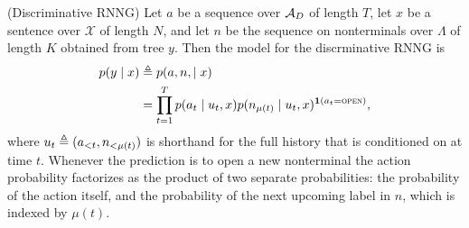 
    \begin{definition}{(Discriminative RNNG)}
      \label{def:disc-rnng}
      Let $a$ be a sequence over $\mathcal{A}_D$ of length $T$, let $x$ be a sentence over $\mathcal{X}$ of length $N$, and let $n$ be the sequence on nonterminals over $\Lambda$ of length $K$ obtained from tree $y$. Then the model for the discrminative RNNG is
      \begin{align*}
        p(y \mid x)
          &\triangleq p(a, n, \mid x)  \\
          &= \prod_{t=1}^T
            p( a_t \mid u_t, x ) p(n_{ \mu(t) } \mid u_t, x )^{ \operatorname{\mathbf{1}}(a_t = \textsc{open}) },
      \end{align*}
      where $u_t \triangleq (a_{<t}, n_{ <\mu(t) })$  is shorthand for the full history that is conditioned on at time $t$. Whenever the prediction is to open a new nonterminal the action probability factorizes as the product of two separate probabilities: the probability of the action itself, and the probability of the next upcoming label in $n$, which is indexed by $\mu(t)$.
    \end{definition}

